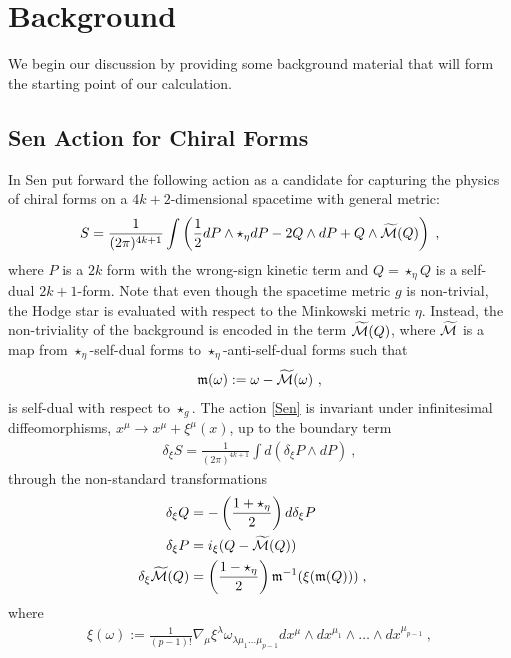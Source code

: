 \documentclass[11pt]{article}
\numberwithin{equation}{section}
\begin{document}
\section{Background}\label{background}

We begin our discussion by providing some background material that will form the starting point of our calculation. 

\subsection{Sen Action for Chiral Forms}

In \cite{Sen:2015nph,Sen:2019qit} Sen put forward the following action as a candidate for capturing the physics of chiral forms on a $4k+2$-dimensional spacetime with general metric:
\begin{align}\label{Sen}
   S   = \frac{1}{(2\pi)^{4k+1}}\int\left(\frac12 d P\wedge\star_\eta d P -2Q\wedge d P +   Q\wedge { \widetilde{ {\cal M}}}(Q)  \right)\;,
\end{align}
where $P$ is a $2k$ form with the wrong-sign kinetic term and $Q = \star_\eta Q$ is a self-dual $2k+1$-form. Note that even though the spacetime metric $g$ is non-trivial, the Hodge star is evaluated with respect to the Minkowski metric $\eta$. Instead, the non-triviality of the background is encoded in the term $\widetilde{ {\cal M}}(Q)$, where $\widetilde{ {\cal M}}$ is a map from $\star_\eta$-self-dual forms to $\star_\eta$-anti-self-dual forms such that
\begin{align}
    \mathfrak{m}(\omega):=\omega-\widetilde{ {\cal M}}(\omega)\ ,
\end{align}
is self-dual with respect to $\star_g$.
The action \eqref{Sen} is invariant under infinitesimal diffeomorphisms, $x^\mu \to x^\mu + \xi^\mu(x)$, up to the boundary term 
\begin{align}\label{DiffeoBoundary}
 \delta_\xi S =   \frac{1}{(2\pi)^{4k+1}}\int d\left(\delta_\xi P\wedge dP\right)\ ,
\end{align}
through the non-standard transformations
\begin{align}\label{DiffeoTranf}
    \delta_{\xi} Q & =-\left(\frac{1+\star_{\eta}}{2}\right) d \delta_{\xi} P\cr
    \delta_{\xi} P &=i_{\xi} (Q - \widetilde{ {\cal M}}(Q))\cr
    \delta_{\xi} \widetilde{ {\cal M}}(Q)& =\left(\frac{1-\star_{\eta}}{2}\right) \mathfrak{m}^{-1}(\xi(\mathfrak{m}(Q)))\;,
\end{align}
where
\begin{align}
\label{beforeFluxes}
    \xi(\omega):=\frac{1}{(p-1) !} \nabla_{\mu} \xi^{\lambda} \omega_{\lambda \mu_{1} \ldots \mu_{p-1}} d x^{\mu} \wedge d x^{\mu_{1}} \wedge \ldots \wedge d x^{\mu_{p-1}}\ ,
\end{align}
\end{document}
